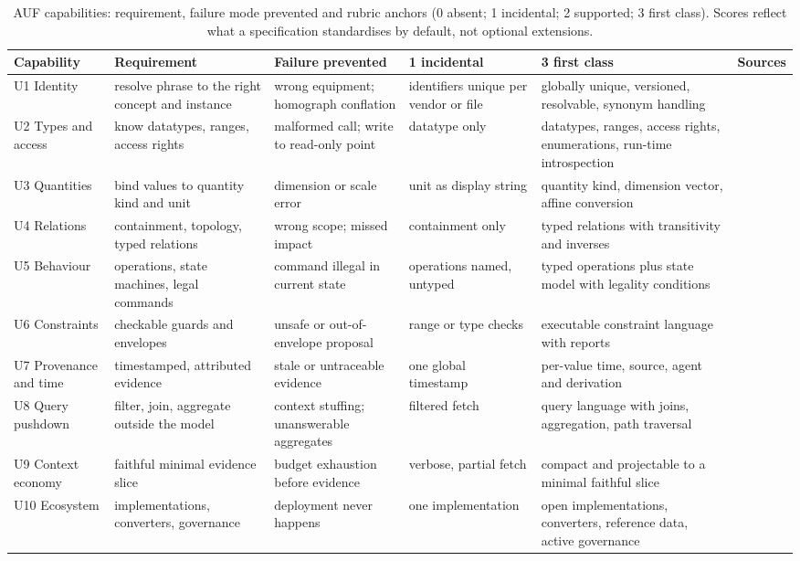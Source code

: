 \begin{table}[t]
\centering\footnotesize
\setlength{\tabcolsep}{3pt}
\caption{AUF capabilities: requirement, failure mode prevented and rubric anchors (0 absent;
1 incidental; 2 supported; 3 first class). Scores reflect what a specification
standardises by default, not optional extensions.}
\label{tab:rubric}
\begin{tabular}{@{}L{1.9cm}L{3.2cm}L{3.0cm}L{2.6cm}L{4.4cm}L{1.6cm}@{}}
\toprule
Capability & Requirement & Failure prevented & 1 incidental & 3 first class & Sources \\
\midrule
U1 Identity & resolve phrase to the right concept and instance & wrong equipment; homograph conflation & identifiers unique per vendor or file & globally unique, versioned, resolvable, synonym handling & \cite{iso29002,eclass,iec61360} \\
U2 Types and access & know datatypes, ranges, access rights & malformed call; write to read-only point & datatype only & datatypes, ranges, access rights, enumerations, run-time introspection & \cite{iec62541,patil2024gorilla} \\
U3 Quantities & bind values to quantity kind and unit & dimension or scale error & unit as display string & quantity kind, dimension vector, affine conversion & \cite{qudt} \\
U4 Relations & containment, topology, typed relations & wrong scope; missed impact & containment only & typed relations with transitivity and inverses & \cite{iec62264,balaji2016brick} \\
U5 Behaviour & operations, state machines, legal commands & command illegal in current state & operations named, untyped & typed operations plus state model with legality conditions & \cite{isa88,vdi2658} \\
U6 Constraints & checkable guards and envelopes & unsafe or out-of-envelope proposal & range or type checks & executable constraint language with reports & \cite{knublauch2017shacl,w3c2018odrl} \\
U7 Provenance and time & timestamped, attributed evidence & stale or untraceable evidence & one global timestamp & per-value time, source, agent and derivation & \cite{w3c2013prov,haller2019ssn} \\
U8 Query pushdown & filter, join, aggregate outside the model & context stuffing; unanswerable aggregates & filtered fetch & query language with joins, aggregation, path traversal & \cite{w3c2013sparql,edge2024graphrag} \\
U9 Context economy & faithful minimal evidence slice & budget exhaustion before evidence & verbose, partial fetch & compact and projectable to a minimal faithful slice & \cite{lewis2020rag,sarmah2024hybridrag} \\
U10 Ecosystem & implementations, converters, governance & deployment never happens & one implementation & open implementations, converters, reference data, active governance & \cite{idta2023aas,mcp} \\
\bottomrule
\end{tabular}
\end{table}

